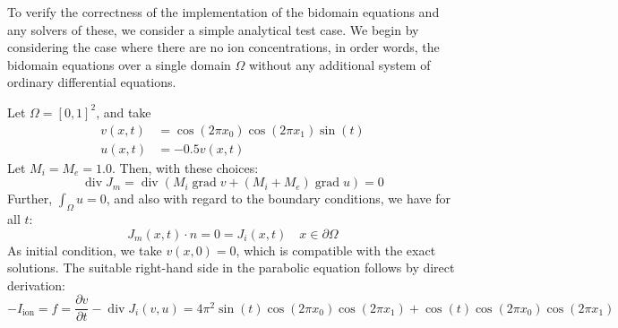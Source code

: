 \documentclass[a4paper, reqno]{amsart}
\DeclareMathOperator{\Div}{div}
\DeclareMathOperator{\Grad}{grad}
\numberwithin{equation}{section}
\begin{document}
To verify the correctness of the implementation of the bidomain
equations and any solvers of these, we consider a simple analytical
test case. We begin by considering the case where there are no ion
concentrations, in order words, the bidomain equations over a single
domain $\Omega$ without any additional system of ordinary differential
equations.

Let $\Omega = [0, 1]^2$, and take
\begin{align}
  v(x, t) &=  \cos(2 \pi x_0) \cos(2 \pi x_1) \sin(t) \\
  u(x, t) &= - 0.5 v(x, t)
\end{align}
Let $M_i = M_e = 1.0$. Then, with these choices:
\begin{equation}
  \Div J_m = \Div (M_i \Grad v + (M_i + M_e) \Grad u) = 0
\end{equation}
Further, $\int_{\Omega} u = 0$, and also with regard to the boundary
conditions, we have for all $t$:
\begin{equation}
  J_m(x, t) \cdot n = 0 = J_i(x, t) \quad x \in \partial \Omega
\end{equation}
As initial condition, we take $v(x, 0) = 0$, which is compatible with
the exact solutions. The suitable right-hand side in the parabolic
equation follows by direct derivation:
\begin{equation}
  -I_{\textrm{ion}} = f = \frac{\partial v}{\partial t} - \Div J_i(v, u) =
  4 \pi^2 \sin(t) \cos(2 \pi x_0) \cos(2 \pi x_1)
  + \cos(t) \cos(2 \pi x_0) \cos(2 \pi x_1)
\end{equation}

 
\end{document}
